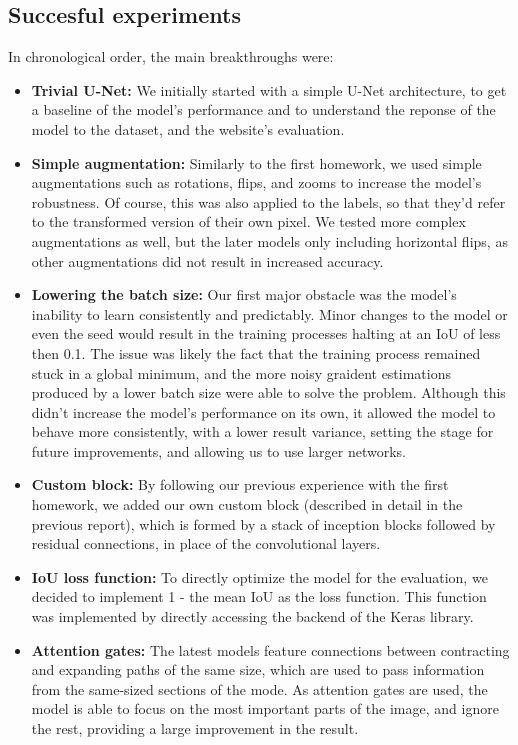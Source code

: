 \documentclass[11pt]{article}
\begin{document}
\begin{multicols}{2}
      \subsection{Succesful experiments}
      In chronological order, the main breakthroughs were:
      \begin{itemize}[leftmargin=*]
            \setlength\itemsep{0em}
            \item \textbf{Trivial U-Net:} We initially started with a simple U-Net architecture, to get a baseline of the model's performance and to understand the reponse of the model to the dataset, and the website's evaluation.
            \item \textbf{Simple augmentation:} Similarly to the first homework, we used simple augmentations such as rotations, flips, and zooms to increase the model's robustness. Of course, this was also applied to the labels, so that they'd refer to the transformed version of their own pixel. We tested more complex augmentations as well, but the later models only including horizontal flips, as other augmentations did not result in increased accuracy.
            \item \textbf{Lowering the batch size:} Our first major obstacle was the model's inability to learn consistently and predictably. Minor changes to the model or even the seed would result in the training processes halting at an IoU of less then 0.1. The issue was likely the fact that the training process remained stuck in a global minimum, and the more noisy graident estimations produced by a lower batch size were able to solve the problem. Although this didn't increase the model's performance on its own, it allowed the model to behave more consistently, with a lower result variance, setting the stage for future improvements, and allowing us to use larger networks.
            \item \textbf{Custom block:} By following our previous experience with the first homework, we added our own custom block (described in detail in the previous report), which is formed by a stack of inception blocks followed by residual connections, in place of the convolutional layers.
            \item \textbf{IoU loss function:} To directly optimize the model for the evaluation, we decided to implement 1 - the mean IoU as the loss function. This function was implemented by directly accessing the backend of the Keras library.
            \item \textbf{Attention gates:} The latest models feature connections between contracting and expanding paths of the same size, which are used to pass information from the same-sized sections of the mode. As attention gates\cite{oktay2018attentionunetlearninglook} are used, the model is able to focus on the most important parts of the image, and ignore the rest, providing a large improvement in the result.
      \end{itemize}


\end{multicols}
\end{document}
